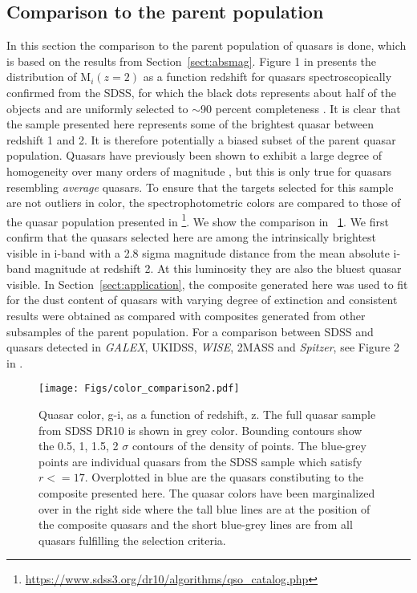 \documentclass{aa}    %
\newcommand{\figref}[1]{\ref{fig:#1}}
\newcommand{\Fig}[1]{\figurename~\figref{#1}}
\newcommand{\fig}[1]{\Fig{#1}}
\newcommand{\figlabel}[1]{\label{fig:#1}}
\newcommand{\sectionname}{Section}
\newcommand{\Sect}[1]{\sectionname~\ref{sect:#1}}
\newcommand{\sect}[1]{\Sect{#1}}
\newcommand{\sectlabel}[1]{\label{sect:#1}}
\begin{document}
\subsection{Comparison to the parent population}  \sectlabel{parents}
In this section the comparison to the parent population of quasars is done, which is based on the results from \sect{absmag}.
Figure 1 in \cite{Shen2011} presents the distribution of M$_i(z=2)$ as a function redshift for quasars spectroscopically confirmed from the SDSS, for which the black dots represents about half of the objects and are uniformly selected to $\sim$90 percent completeness \citet{Richards2002, VandenBerk2005}. It is clear that the sample presented here represents some of the brightest quasar between redshift 1 and 2. It is therefore potentially a biased subset of the parent quasar population. Quasars have previously been shown to exhibit a large degree of homogeneity over many orders of magnitude \citep{Dietrich2002}, but this is only true for quasars resembling \textit{average} quasars. To ensure that the targets selected for this sample are not outliers in color, the spectrophotometric colors are compared to those of the quasar population presented in \citet{Paris2014}\footnote{\url{https://www.sdss3.org/dr10/algorithms/qso_catalog.php}}. We show the comparison in \fig{color_comparison}. We first confirm that the quasars selected here are among the intrinsically brightest visible in i-band with a 2.8 sigma magnitude distance from the mean absolute i-band magnitude at redshift 2. At this luminosity they are also the bluest quasar visible. In \sect{application}, the composite generated here was used to fit for the dust content of quasars with varying degree of extinction and consistent results were obtained as compared with composites generated from other subsamples of the parent population. For a comparison between SDSS and quasars detected in \textit{GALEX}, UKIDSS, \textit{WISE}, 2MASS and \textit{Spitzer}, see Figure 2 in \cite{Krawczyk2013}.


 \begin{figure}[hbtp]
   \centering
   \texttt{[image: Figs/color\_comparison2.pdf]}
   \caption[]{Quasar color, g-i,  as a function of redshift, z. The full quasar sample from SDSS DR10 \citep{Paris2014} is shown in grey color. Bounding contours show the 0.5, 1, 1.5, 2 $\sigma$ contours of the density of points. The blue-grey points are individual quasars from the SDSS sample which satisfy $r <= 17$. Overplotted in blue are the quasars constibuting to the composite presented here. The quasar colors have been marginalized over in the right side where the tall blue lines are at the position of the composite quasars and the short blue-grey lines are from all quasars fulfilling the selection criteria.}
  \figlabel{color_comparison}
 \end{figure}
\end{document}
